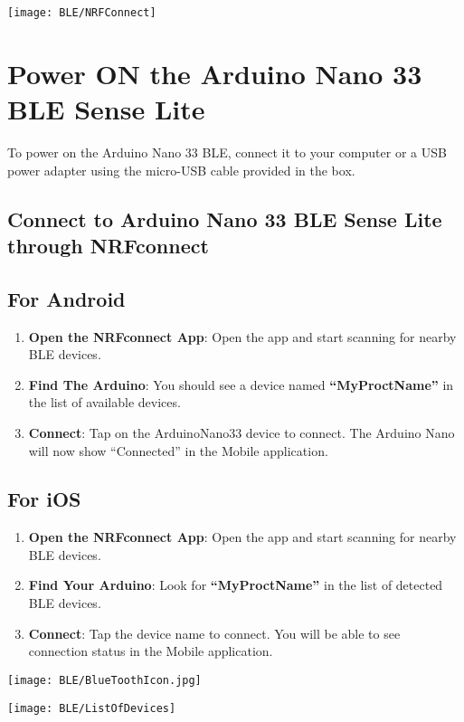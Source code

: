 \begin{center}
	\texttt{[image: BLE/NRFConnect]}
	\label{fig:NRFConnectDownloadPage}
\end{center}

\section{Power ON the Arduino Nano 33 BLE Sense Lite}
To power on the Arduino Nano 33 BLE, connect it to your computer or a USB power adapter using the micro-USB cable provided in the box.

\subsection{Connect to Arduino Nano 33 BLE Sense Lite through NRFconnect}

\subsection{For Android}
\begin{enumerate}[label=\textbullet]
	\item \textbf{Open the NRFconnect App}: Open the app and start scanning for nearby BLE devices.
	\item \textbf{Find The Arduino}: You should see a device named \textbf{``MyProctName''} in the list of available devices.
	\item \textbf{Connect}: Tap on the ArduinoNano33 device to connect. The Arduino Nano will now show ``Connected'' in the Mobile application.
\end{enumerate}

\subsection{For iOS}
\begin{enumerate}[label=\textbullet]
	\item \textbf{Open the NRFconnect App}: Open the app and start scanning for nearby BLE devices.
	\item \textbf{Find Your Arduino}: Look for \textbf{``MyProctName''} in the list of detected BLE devices.
	\item \textbf{Connect}: Tap the device name to connect. You will be able to see connection status in the Mobile application.
\end{enumerate}

\begin{center}
	\texttt{[image: BLE/BlueToothIcon.jpg]}
	\label{fig:Landing page of App}
\end{center}

\bigskip

\begin{center}

	\texttt{[image: BLE/ListOfDevices]} %
	\label{fig:List of devices}
\end{center}



